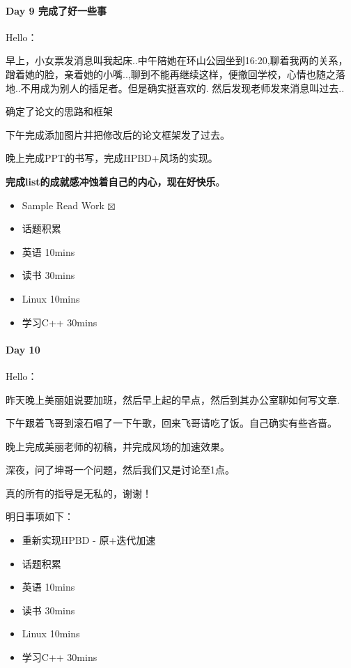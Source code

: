 \documentclass[UTF8,a4paper,8pt]{ctexbook}
\begin{document}
 	 \paragraph{Day 9   完成了好一些事    \quad     }
	 	 Hello：
	 	 
	 	 早上，小女票发消息叫我起床..中午陪她在环山公园坐到16:20,聊着我两的关系，蹭着她的脸，亲着她的小嘴..,聊到不能再继续这样，便撤回学校，心情也随之落地..不用成为别人的插足者。但是确实挺喜欢的. 然后发现老师发来消息叫过去..
	 	 
	 	 确定了论文的思路和框架
	 	 
	 	 下午完成添加图片并把修改后的论文框架发了过去。
	 	 
	 	 晚上完成PPT的书写，完成HPBD+风场的实现。
 	 
	 	 \textbf{完成list的成就感冲蚀着自己的内心，现在好快乐}。
			 	 \begin{itemize}
			 	 	\item  Sample Read Work	$\boxtimes$
			 	 	\item  话题积累 	
			 	 	\item  英语 10mins 	
			 	 	\item  读书 30mins	
			 	 	\item  Linux 10mins	  
			 	 	\item  学习C++ 30mins  
			 	 \end{itemize}
			 	 
 	 \paragraph{Day 10      \quad     }
		 	Hello：
		 	
		 	昨天晚上美丽姐说要加班，然后早上起的早点，然后到其办公室聊如何写文章.
		 	
		 	下午跟着飞哥到滚石唱了一下午歌，回来飞哥请吃了饭。自己确实有些吝啬。
		 	
		 	晚上完成美丽老师的初稿，并完成风场的加速效果。
		 	
		 	深夜，问了坤哥一个问题，然后我们又是讨论至1点。
		 	
		 	真的所有的指导是无私的，谢谢！
		 	
		 	明日事项如下：
			 	 \begin{itemize}
			 	 	\item  重新实现HPBD - 原+迭代加速	\makebox[0pt][l]{$\square$}\raisebox{.15ex}{\hspace{0.1em}$\checkmark$}
			 	 	\item  话题积累 \makebox[0pt][l]{$\square$}\raisebox{.15ex}{\hspace{0.1em}$\checkmark$}	
			 	 	\item  英语 10mins 	
			 	 	\item  读书 30mins	
			 	 	\item  Linux 10mins	  \makebox[0pt][l]{$\square$}\raisebox{.15ex}{\hspace{0.1em}$\checkmark$}
			 	 	\item  学习C++ 30mins  
			 	 \end{itemize}
\end{document}

